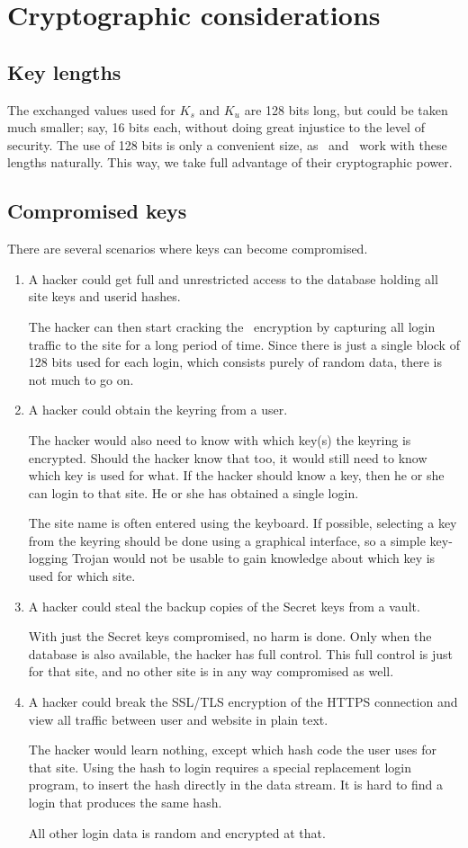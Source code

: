 \section{Cryptographic considerations}
\label{sec:crypto}
\subsection{Key lengths}
The exchanged values used for $K_s$ and $K_u$ are 128 bits long,
but could be taken much smaller;
say,
16 bits each,
without doing great injustice to the level of security.
The use of 128 bits is only a convenient size,
as \AES\ and \SHA\ work with these lengths naturally.
This way,
we take full advantage of their cryptographic power.

\subsection{Compromised keys}
There are several scenarios where keys can become compromised.
\begin{enumerate}
\item A hacker could get full and unrestricted access to the database holding all site keys and userid hashes.
\par
The hacker can then start cracking the \AES\ encryption by capturing all
login traffic to the site for a long period of time.
Since there is just a single block of 128 bits used for each login,
which consists purely of random data,
there is not much to go on.
\item A hacker could obtain the keyring from a user.
\par
The hacker would also need to know with which key(s) the keyring is encrypted.
Should the hacker know that too, it would still need to know which key is used for what.
If the hacker should know a key, then he or she can login to that site.
He or she has obtained a single login.
\par
The site name is often entered using the keyboard.
If possible,
selecting a key from the keyring should be done using a graphical interface,
so a simple key-logging Trojan would not be usable to gain knowledge about which key is used for which site.
\item A hacker could steal the backup copies of the Secret keys from a vault.
\par
With just the Secret keys compromised, no harm is done.
Only when the database is also available, the hacker has full control.
This full control is just for that site, and no other site is in any way compromised as well.
\item A hacker could break the SSL/TLS encryption of the HTTPS connection and
view all traffic between user and website in plain text.
\par
The hacker would learn nothing, except which \SHA hash code the user uses for that site.
Using the hash to login requires a special replacement login program, to insert the hash directly in the data stream.
It is hard to find a login that produces the same hash.
\par
All other login data is random and encrypted at that.
\end{enumerate}

